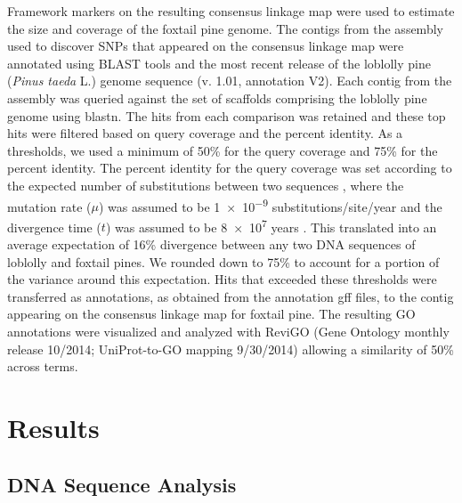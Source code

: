 \documentclass[smallextended]{svjour3}
\begin{document}
Framework markers on the resulting consensus linkage map were used to estimate
the size \citep{Chakravarti:1991} and coverage \citep{Lange:1982} of the foxtail
pine genome. The contigs from the assembly used to discover SNPs that appeared
on the consensus linkage map were annotated using BLAST tools
\citep{Altschul:1990vt} and the most recent release of the loblolly pine
(\textit{Pinus taeda} L.) genome sequence (v. 1.01, annotation V2). Each contig
from the assembly was queried against the set of scaffolds comprising the
loblolly pine genome using blastn. The hits from each comparison was retained
and these top hits were filtered based on query coverage and the percent
identity. As a thresholds, we used a minimum of 50\% for the query coverage and
75\% for the percent identity. The percent identity for the query coverage was
set according to the expected number of substitutions between two sequences
\citep[$2 \mu t$, see][]{Nei:1987}, where the mutation rate ($\mu$) was assumed
to be \num{1e-9} \si{substitutions/site/year} and the divergence time ($t$)
was assumed to be \num{8e7} years \citep{Willyard:2007}.  This translated
into an average expectation of 16\% divergence between any two DNA sequences of
loblolly and foxtail pines. We rounded down to 75\% to account for a portion of
the variance around this expectation. Hits that exceeded these thresholds were
transferred as annotations, as obtained from the annotation gff files, to the
contig appearing on the consensus linkage map for foxtail pine. The resulting GO
annotations were visualized and analyzed with ReviGO (Gene Ontology monthly
release 10/2014; UniProt-to-GO mapping 9/30/2014) \citep{Supek:2011bw} allowing
a similarity of 50\% across terms.

\section*{Results}

\subsection*{DNA Sequence Analysis}
\end{document}
